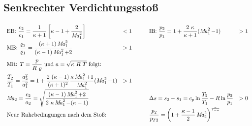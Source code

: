 \subsection{Senkrechter Verdichtungsstoß}
	\setlength{\abovedisplayskip}{-15pt}
		\[ \arraycolsep=0.5em \def\arraystretch{2}
		\begin{array}{llp{1em}ll}
			\text{EB: } \dfrac{c_2}{c_1} = \dfrac{1}{\kappa+1}  \left[ \kappa - 1 + \dfrac{2}{\Mach_1^2}\right]                                    & < 1 &  & \text{IB: } \dfrac{p_2}{p_1} = 1+ \dfrac{2\ \kappa}{\kappa+1} (\Mach_1^2 - 1)                   & > 1 \\
			\text{MB: } \dfrac{\varrho_2}{\varrho_1} = \dfrac{(\kappa+1)\Mach_1^2}  {(\kappa-1)\Mach_1^2 + 2}                                      & > 1 &  &                                                                                                 &     \\
			\text{Mit: }  T = \dfrac{p}{R\ \varrho} \text{ und } a = \sqrt{\kappa\ R\ T} \text{ folgt: }                                           &     &  &                                                                                                 &     \\
			\dfrac{T_2}{T_1} = \dfrac{a_2^2}{a_1^2} = 1 +\dfrac{2\ (\kappa-1)}{(\kappa+1)^2}  \dfrac{\kappa \Mach_1^2+1}{\Mach_1^2}  (\Mach_1^2-1) & > 1 &  &                                                                                                 &     \\
			\Mach_2 = \dfrac{c_2}{a_2} = \sqrt{\dfrac{(\kappa-1) \Mach_1^2 + 2}{2\ \kappa\Mach_1^2 - (\kappa-1)}}                                  &     &  & \Delta s = s_2 - s_1 = c_p \ln\dfrac{T_2}{T_1} - R \ln\dfrac{p_2}{p_1}                          & >0  \\
			\text{Neue Ruhebedingungen nach dem Stoß:}                                                                                             &     &  & \dfrac{p_2}{p_{T2}} = \left( 1+ \dfrac{\kappa -1}{2}\Mach_2^2\right) ^{\frac{\kappa}{1-\kappa}} &
		\end{array} \]
	
